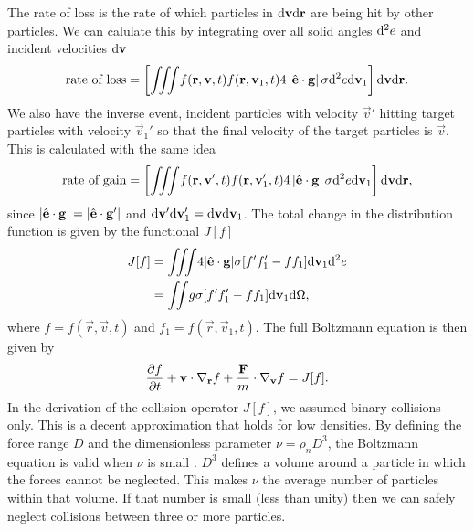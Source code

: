 The rate of loss is the rate of which particles in $\mathrm{d}\mathbf v\mathrm{d}\mathbf r$ are being hit by other particles. We can calulate this by integrating over all solid angles $\mathrm{d}^2 e$ and incident velocities $\mathrm{d}\mathbf v$
\begin{align}
	\text{rate of loss} = \left[\iiint\! f(\mathbf r, \mathbf v, t)f(\mathbf r, \mathbf v_1, t)4\left|\hat {\mathbf{e}} \cdot \mathbf g \right|\sigma \mathrm{d}^2 e\mathrm{d}\mathbf v_1\right]\mathrm{d}\mathbf v\mathrm{d}\mathbf r.
\end{align}
We also have the inverse event, incident particles with velocity $\vec v'$ hitting target particles with velocity $\vec v_1'$ so that the final velocity of the target particles is $\vec v$. This is calculated with the same idea
\begin{align}
	\text{rate of gain} = \left[\iiint\! f(\mathbf r, \mathbf v', t)f(\mathbf r, \mathbf v_1', t)4\left|\hat {\mathbf{e}} \cdot \mathbf g \right|\sigma \mathrm{d}^2 e\mathrm{d}\mathbf v_1\right]\mathrm{d}\mathbf v\mathrm{d}\mathbf r,
\end{align}
since $|\hat {\mathbf{e}}\cdot \mathbf g| = |\hat {\mathbf{e}}\cdot \mathbf g'|$ and $\mathrm{d}\mathbf v'\mathrm{d}\mathbf v_1' = \mathrm{d}\mathbf v\mathrm{d}\mathbf v_1$. The total change in the distribution function is given by the functional $J[f]$
\begin{align}
	J[f] &= \iiint\! 4|\hat {\mathbf{e}}\cdot\mathbf g|\sigma[f'f_1' - ff_1]\mathrm{d}\mathbf v_1 \mathrm{d}^2e\\
	&= \iint\! g \sigma[f'f_1' - ff_1] \mathrm{d}\mathbf v_1 \mathrm{d}\Omega,
\end{align}
where $f = f(\vec r, \vec v, t)$ and $f_1 = f(\vec r, \vec v_1, t)$. The full Boltzmann equation is then given by
\begin{align}
	\label{eq:boltzmann_equation}
	\frac{\partial f}{\partial t} + \mathbf v\cdot \nabla_\mathbf r f + \frac{\mathbf F}{m}\cdot\nabla_\mathbf v f = J[f].
\end{align}
In the derivation of the collision operator $J[f]$, we assumed binary collisions only. This is a decent approximation that holds for low densities. By defining the force range $D$ and the dimensionless parameter $\nu = \rho_n D^3$, the Boltzmann equation is valid when $\nu$ is small \cite{mclennan1989introduction}. $D^3$ defines a volume around a particle in which the forces cannot be neglected. This makes $\nu$ the average number of particles within that volume. If that number is small (less than unity) then we can safely neglect collisions between three or more particles.
